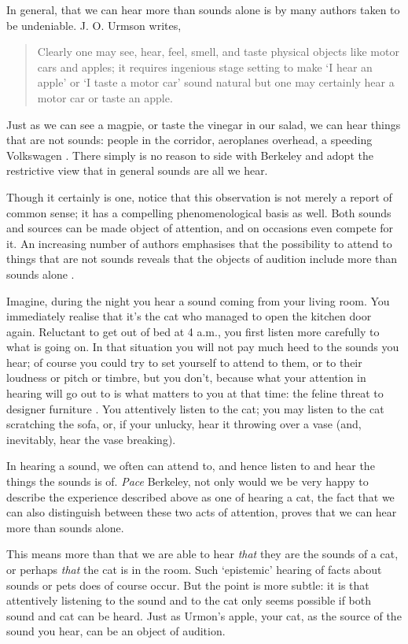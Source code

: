 \documentclass[sloppy, journal, git, bytitle, dodraft]{humapap}
\begin{document}
In general, that we can hear more than sounds alone is by many authors taken to be undeniable. J. O. Urmson writes, 
\begin{quote}
Clearly one may see, hear, feel, smell, and taste physical objects like motor cars and apples; it requires ingenious stage setting to make `I hear an apple' or `I taste a motor car' sound natural \lips but one may certainly hear a motor car or taste an apple.\autocite[p. 117]{urmson1968aa}
\end{quote} Just as we can see a magpie, or taste the vinegar in our salad, we can hear things that are not sounds: people in the corridor, aeroplanes overhead, a speeding Volkswagen \autocite[cf.][p. 10-11]{heidegger1977aa}. There simply is no reason to side with Berkeley and adopt the restrictive view that in general sounds are all we hear. 

Though it certainly is one, notice that this observation is not merely a report of common sense; it has a compelling phenomenological basis as well. Both sounds and sources can be made object of attention, and on occasions even compete for it. An increasing number of authors emphasises that the possibility to attend to things that are not sounds reveals that the objects of audition include more than sounds alone \autocite[See the papers in][]{ocallaghan2009aa}.  

Imagine, during the night you hear a sound coming from your living room. You immediately realise that it's the cat who managed to open the kitchen door again. Reluctant to get out of bed at 4 a.m., you first listen more carefully to what is going on. In that situation you will not pay much heed to the sounds you hear; of course you could try to set yourself to attend to them, or to their loudness or pitch or timbre, but you don't, because what your attention in hearing will go out to is what matters to you at that time: the feline threat to designer furniture \autocite[cf.][]{nudds2007aa}. You attentively listen to the cat; you may listen to the cat scratching the sofa, or, if your unlucky, hear it throwing over a vase (and, inevitably, hear the vase breaking).

In hearing a sound, we often can attend to, and hence listen to and hear the things the sounds is of. \emph{Pace} Berkeley, not only would we be very happy to describe the experience described above as one of hearing a cat, the fact that we can also distinguish between these two acts of attention, proves that we can hear more than sounds alone.

This means more than that we are able to hear \emph{that} they are the sounds of a cat, or perhaps \emph{that} the cat is in the room. Such `epistemic' hearing of facts about sounds or pets does of course occur. But the point is more subtle: it is that attentively listening to the sound and to the cat only seems possible if both sound and cat can be heard. Just as Urmon's apple, your cat, as the source of the sound you hear, can be an object of audition. 
\end{document}
